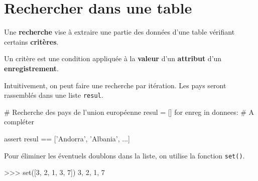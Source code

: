 \pagebreak

\section{Rechercher dans une table}

\begin{definition}{}
Une \textbf{recherche} vise à extraire une partie des données d'une table vérifiant certains \textbf{critères}.

Un critère est une condition appliquée à la \textbf{valeur} d'un \textbf{attribut} d'un \textbf{enregistrement}.

\end{definition}


\begin{exercice_cours}{}

	Intuitivement, on peut faire une recherche par itération. Les pays seront rassemblés dans une liste \verb+resul+.

\begin{CodePythontexAlt}[Largeur=1\linewidth,Centre,PremLigne=1, lineNumbers=false]{}
# Recherche des pays de l'union européenne
resul = []
for enreg in donnees:
	# A compléter
	
	



assert resul == ['Andorra', 'Albania', ...]
\end{CodePythontexAlt}

\end{exercice_cours}

\begin{exercice_cours}{}


	\end{exercice_cours}


	\begin{remarque}{}
		Pour éliminer les éventuels doublons dans la liste, on utilise la fonction \verb+set()+.
	
	
\begin{CodePythontexAlt}[Largeur=1\linewidth,Centre,PremLigne=1, lineNumbers=false]{}
>>> set([3, 2, 1, 3, 7])
{3, 2, 1, 7}
\end{CodePythontexAlt}
	\end{remarque}


\begin{exercice_cours}{}


	\end{exercice_cours}

